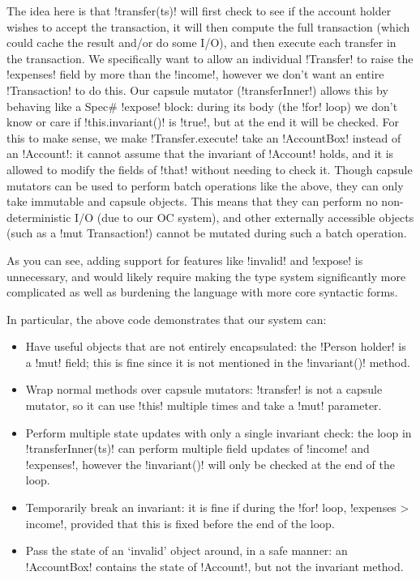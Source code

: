 The idea here is that \Q!transfer(ts)! will first check to see if the account holder wishes to accept the transaction, it will then compute the full transaction (which could cache the result and/or do some I/O), and then execute each transfer in the transaction. We specifically want to allow an individual \Q!Transfer! to raise the \Q!expenses! field by more than the \Q!income!, however we don't want an entire \Q!Transaction! to do this. 
Our capsule mutator (\Q!transferInner!) allows this by behaving like a Spec\# \Q!expose! block: during its body (the \Q!for! loop) we don't know or care if \Q!this.invariant()! is \Q!true!, but at the end it will be checked. For this to make sense, we make \Q!Transfer.execute! take an \Q!AccountBox! instead of an \Q!Account!: it cannot assume that the invariant of \Q!Account! holds, and it is allowed to modify the fields of \Q!that! without needing to check it. Though capsule mutators can be used to perform batch operations like the above, they can only take immutable and capsule objects. This means that they can perform no non-deterministic I/O (due to our OC system), and other externally accessible objects (such as a \Q!mut Transaction!) cannot be mutated during such a batch operation.

As you can see, adding support for features like \Q!invalid! and \Q!expose! is unnecessary, and would likely require making the type system significantly more complicated as well as burdening the language with more core syntactic forms.

In particular, the above code demonstrates that our system can:
\begin{itemize}
\item Have useful objects that are not entirely encapsulated: the \Q!Person holder! is a \Q!mut! field; this is fine since it is not mentioned in the \Q!invariant()! method.
\item Wrap normal methods over capsule mutators: \Q!transfer! is not a capsule mutator, so it can use \Q!this! multiple times and take a \Q!mut! parameter.
\item Perform multiple state updates with only a single invariant check: the loop in \Q!transferInner(ts)! can perform multiple field updates of \Q!income! and \Q!expenses!, however the \Q!invariant()! will only be checked at the end of the loop.
\item Temporarily break an invariant: it is fine if during the \Q!for! loop, \Q!expenses > income!, provided that this is fixed before the end of the loop.
\item Pass the state of an `invalid' object around, in a safe manner: an \Q!AccountBox! contains the state of \Q!Account!, but not the invariant method.
\end{itemize}

